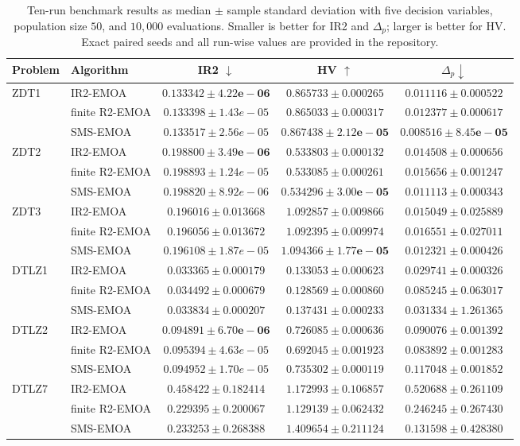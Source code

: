 \documentclass[runningheads]{llncs}
\begin{document}
\begin{table}[t]
\centering
\caption{Ten-run benchmark results as median $\pm$ sample standard deviation with five decision variables, population size $50$, and $10{,}000$ evaluations. Smaller is better for IR2 and $\Delta_p$; larger is better for HV. Exact paired seeds and all run-wise values are provided in the repository.}
\label{tab:benchmark10}
\scriptsize
\setlength{\tabcolsep}{2.5pt}
\begin{tabular}{llccc}
\toprule
Problem & Algorithm & IR2 $\downarrow$ & HV $\uparrow$ & $\Delta_p\downarrow$\\
\midrule
ZDT1 & IR2-EMOA & $\mathbf{0.133342\pm4.22e-06}$ & $0.865733\pm0.000265$ & $0.011116\pm0.000522$\\
 & finite R2-EMOA & $0.133398\pm1.43e-05$ & $0.865033\pm0.000317$ & $0.012377\pm0.000617$\\
 & SMS-EMOA & $0.133517\pm2.56e-05$ & $\mathbf{0.867438\pm2.12e-05}$ & $\mathbf{0.008516\pm8.45e-05}$\\
\addlinespace[1pt]
ZDT2 & IR2-EMOA & $\mathbf{0.198800\pm3.49e-06}$ & $0.533803\pm0.000132$ & $0.014508\pm0.000656$\\
 & finite R2-EMOA & $0.198893\pm1.24e-05$ & $0.533085\pm0.000261$ & $0.015656\pm0.001247$\\
 & SMS-EMOA & $0.198820\pm8.92e-06$ & $\mathbf{0.534296\pm3.00e-05}$ & $\mathbf{0.011113\pm0.000343}$\\
\addlinespace[1pt]
ZDT3 & IR2-EMOA & $\mathbf{0.196016\pm0.013668}$ & $1.092857\pm0.009866$ & $0.015049\pm0.025889$\\
 & finite R2-EMOA & $0.196056\pm0.013672$ & $1.092395\pm0.009974$ & $0.016551\pm0.027011$\\
 & SMS-EMOA & $0.196108\pm1.87e-05$ & $\mathbf{1.094366\pm1.77e-05}$ & $\mathbf{0.012321\pm0.000426}$\\
\addlinespace[1pt]
DTLZ1 & IR2-EMOA & $\mathbf{0.033365\pm0.000179}$ & $0.133053\pm0.000623$ & $\mathbf{0.029741\pm0.000326}$\\
 & finite R2-EMOA & $0.034492\pm0.000679$ & $0.128569\pm0.000860$ & $0.085245\pm0.063017$\\
 & SMS-EMOA & $0.033834\pm0.000207$ & $\mathbf{0.137431\pm0.000233}$ & $0.031334\pm1.261365$\\
\addlinespace[1pt]
DTLZ2 & IR2-EMOA & $\mathbf{0.094891\pm6.70e-06}$ & $0.726085\pm0.000636$ & $0.090076\pm0.001392$\\
 & finite R2-EMOA & $0.095394\pm4.63e-05$ & $0.692045\pm0.001923$ & $\mathbf{0.083892\pm0.001283}$\\
 & SMS-EMOA & $0.094952\pm1.70e-05$ & $\mathbf{0.735302\pm0.000119}$ & $0.117048\pm0.001852$\\
\addlinespace[1pt]
DTLZ7 & IR2-EMOA & $0.458422\pm0.182414$ & $1.172993\pm0.106857$ & $0.520688\pm0.261109$\\
 & finite R2-EMOA & $\mathbf{0.229395\pm0.200067}$ & $1.129139\pm0.062432$ & $0.246245\pm0.267430$\\
 & SMS-EMOA & $0.233253\pm0.268388$ & $\mathbf{1.409654\pm0.211124}$ & $\mathbf{0.131598\pm0.428380}$\\
\bottomrule
\end{tabular}
\end{table}
\end{document}
